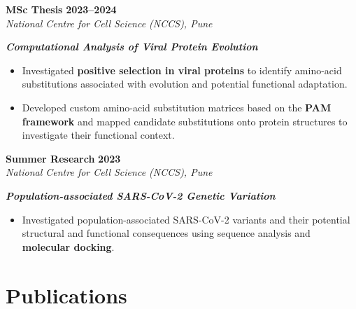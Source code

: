 \documentclass[10pt,a4paper]{article}
\newcommand{\entry}[4]{
    \noindent\textbf{#1} \hfill \textbf{#2}\\
    \textit{#3} \hfill #4\vspace{0.3em}\par
}
\newcommand{\project}[1]{
    \noindent\textbf{\textit{#1}}\vspace{0.1em}\par
}
\begin{document}

\entry
{MSc Thesis}
{2023--2024}
{National Centre for Cell Science (NCCS), Pune}
{}

\project{Computational Analysis of Viral Protein Evolution}
\begin{itemize}
\item Investigated \textbf{positive selection in viral proteins} to identify amino-acid substitutions associated with evolution and potential functional adaptation.
\item Developed custom amino-acid substitution matrices based on the \textbf{PAM framework} and mapped candidate substitutions onto protein structures to investigate their functional context.
\end{itemize}


\entry
{Summer Research}
{2023}
{National Centre for Cell Science (NCCS), Pune}
{}

\project{Population-associated SARS-CoV-2 Genetic Variation}
\begin{itemize}
\item Investigated population-associated SARS-CoV-2 variants and their potential structural and functional consequences using sequence analysis and \textbf{molecular docking}.
\end{itemize}


\section{Publications}
\end{document}
